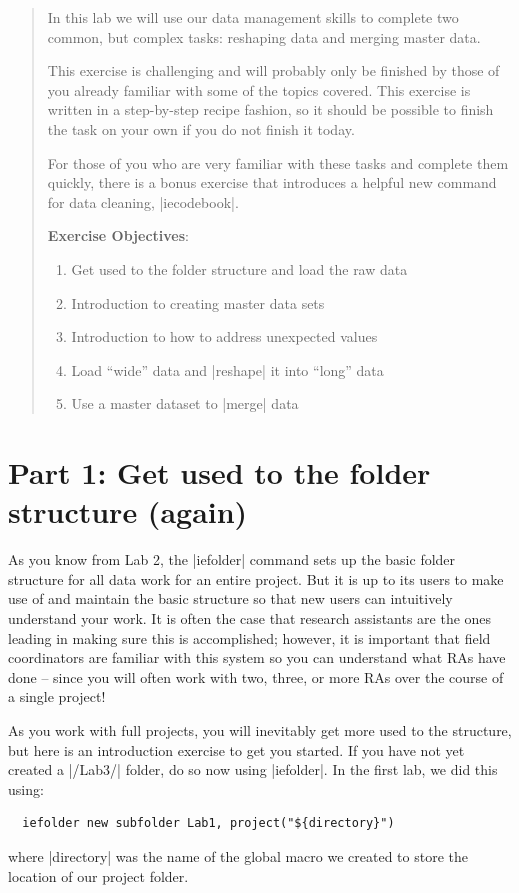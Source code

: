 \documentclass{tufte-handout}
\begin{document}
\begin{abstract}
In this lab we will use our data management skills to complete two common, but complex tasks: reshaping data and merging master data.

This exercise is challenging and will probably only be finished by those of you already familiar with some of the topics covered. This exercise is written in a step-by-step recipe fashion, so it should be possible to finish the task on your own if you do not finish it today.

For those of you who are very familiar with these tasks and complete them quickly, there is a bonus exercise that introduces a helpful new command for data cleaning, |iecodebook|.

\bigskip\noindent \textbf{Exercise Objectives}:
\begin{enumerate}
  \item Get used to the folder structure and load the raw data
  \item Introduction to creating master data sets
  \item Introduction to how to address unexpected values
  \item Load “wide” data and |reshape| it into “long” data
  \item Use a master dataset to |merge| data
\end{enumerate}
\end{abstract}

\section{Part 1: Get used to the folder structure (again)}

As you know from Lab 2, the |iefolder| command sets up
the basic folder structure for all data work for an entire project.
But it is up to its users to make use of
and maintain the basic structure so that
new users can intuitively understand your work.
It is often the case that research assistants
are the ones leading in making sure this is accomplished;
however, it is important that field coordinators are familiar with this system
so you can understand what RAs have done –
since you will often work with two, three, or more RAs
over the course of a single project!

As you work with full projects,
you will inevitably get more used to the structure,
but here is an introduction exercise to get you started.
If you have not yet created a |/Lab3/| folder,
do so now using |iefolder|.
In the first lab, we did this using:
\begin{Verbatim}
  iefolder new subfolder Lab1, project("${directory}")
\end{Verbatim}
where |directory| was the name of the global macro
we created to store the location of our project folder.
\end{document}
